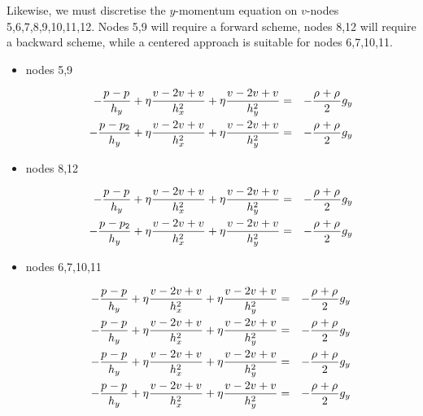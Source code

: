 Likewise, we must discretise the $y$-momentum equation on $v$-nodes 5,6,7,8,9,10,11,12.
Nodes 5,9 will require a forward scheme, nodes 8,12 will require a backward scheme, 
while a centered approach is suitable for nodes 6,7,10,11.

\begin{itemize}
\item nodes 5,9

\begin{eqnarray}
-\frac{p_{\tt }-p_{\tt }}{h_y}       
+ \eta \frac{v_{\tt } -2v_{\tt }+v_{\tt }}{h_x^2} 
+ \eta \frac{v_{\tt } -2v_{\tt }+v_{\tt }}{h_y^2}  
&=& - \frac{\rho_{\tt } + \rho_{\tt }}{2} g_y   
\\
-\frac{p_{\tt }-p_{\tt 2}}{h_y}       
+ \eta \frac{v_{\tt } -2v_{\tt }+v_{\tt }}{h_x^2} 
+ \eta \frac{v_{\tt } -2v_{\tt }+v_{\tt }}{h_y^2}  
&=& - \frac{\rho_{\tt } + \rho_{\tt }}{2} g_y   
\end{eqnarray}


\item nodes 8,12

\begin{eqnarray}
-\frac{p_{\tt }-p_{\tt }}{h_y}       
+ \eta \frac{v_{\tt } -2v_{\tt }+v_{\tt }}{h_x^2} 
+ \eta \frac{v_{\tt } -2v_{\tt }+v_{\tt }}{h_y^2}  
&=& - \frac{\rho_{\tt } + \rho_{\tt }}{2} g_y   
\\
-\frac{p_{\tt }-p_{\tt 2}}{h_y}       
+ \eta \frac{v_{\tt } -2v_{\tt }+v_{\tt }}{h_x^2} 
+ \eta \frac{v_{\tt } -2v_{\tt }+v_{\tt }}{h_y^2}  
&=& - \frac{\rho_{\tt } + \rho_{\tt }}{2} g_y   
\end{eqnarray}


\item nodes 6,7,10,11

\begin{eqnarray}
-\frac{p_{\tt }-p_{\tt }}{h_y}       
+ \eta \frac{v_{\tt } -2v_{\tt }+v_{\tt }}{h_x^2} 
+ \eta \frac{v_{\tt } -2v_{\tt }+v_{\tt }}{h_y^2}  
&=& - \frac{\rho_{\tt } + \rho_{\tt }}{2} g_y   
\\
-\frac{p_{\tt }-p_{\tt }}{h_y}       
+ \eta \frac{v_{\tt } -2v_{\tt }+v_{\tt }}{h_x^2} 
+ \eta \frac{v_{\tt } -2v_{\tt }+v_{\tt }}{h_y^2}  
&=& - \frac{\rho_{\tt } + \rho_{\tt }}{2} g_y   
\\
-\frac{p_{\tt }-p_{\tt }}{h_y}       
+ \eta \frac{v_{\tt } -2v_{\tt }+v_{\tt }}{h_x^2} 
+ \eta \frac{v_{\tt } -2v_{\tt }+v_{\tt }}{h_y^2}  
&=& - \frac{\rho_{\tt } + \rho_{\tt }}{2} g_y   
\\
-\frac{p_{\tt }-p_{\tt }}{h_y}       
+ \eta \frac{v_{\tt } -2v_{\tt }+v_{\tt }}{h_x^2} 
+ \eta \frac{v_{\tt } -2v_{\tt }+v_{\tt }}{h_y^2}  
&=& - \frac{\rho_{\tt } + \rho_{\tt }}{2} g_y   
\end{eqnarray}


\end{itemize}


